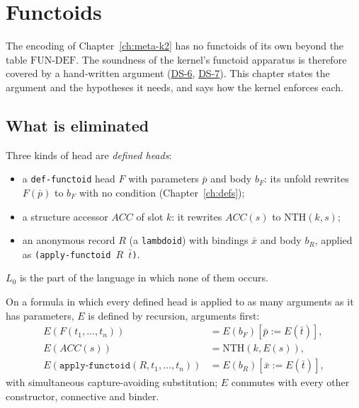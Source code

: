 \providecommand{\DS}[1]{\hyperref[ds:#1]{DS-#1}}

\chapter{Functoids}
\label{ch:meta-functoids}

The encoding of Chapter~\ref{ch:meta-k2} has no functoids of its own
beyond the table $\mathrm{FUN\text{-}DEF}$.  The soundness of the kernel's
functoid apparatus is therefore covered by a hand-written argument
(\DS{6}, \DS{7}).  This chapter states the argument and the hypotheses it
needs, and says how the kernel enforces each.

\section{What is eliminated}

Three kinds of head are \emph{defined heads}:
\begin{itemize}
\item a \texttt{def-functoid} head $F$ with parameters $\bar p$ and body
  $b_F$: its unfold rewrites $F(\bar p)$ to $b_F$ with no condition
  (Chapter~\ref{ch:defs});
\item a structure accessor $\mathit{ACC}$ of slot $k$: it rewrites
  $\mathit{ACC}(s)$ to $\mathrm{NTH}(k, s)$;
\item an anonymous record $R$ (a \texttt{lambdoid}) with bindings $\bar x$
  and body $b_R$, applied as \texttt{(apply-functoid $R$ $\bar t$)}.
\end{itemize}
$L_0$ is the part of the language in which none of them occurs.

\begin{dfn}
On a formula in which every defined head is applied to as many arguments
as it has parameters, $E$ is defined by recursion, arguments first:
\[
\begin{aligned}
E(F(t_1,\ldots,t_n)) &= E(b_F)[\bar p := E(\bar t)],\\
E(\mathit{ACC}(s)) &= \mathrm{NTH}(k, E(s)),\\
E(\texttt{apply-functoid}(R, t_1,\ldots,t_n)) &= E(b_R)[\bar x := E(\bar t)],
\end{aligned}
\]
with simultaneous capture-avoiding substitution; $E$ commutes with every
other constructor, connective and binder.
\end{dfn}

